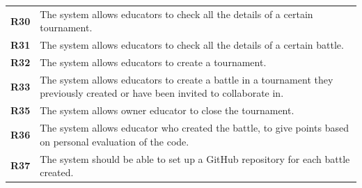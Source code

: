 \documentclass[12pt, a4paper]{report}
\begin{document}
\begin{table}[H]
\begin{tabularx}{\textwidth}{cX}
        \textbf{R30}  & The system allows educators to check all the details of a certain tournament.\\
        \textbf{R31}  & The system allows educators to check all the details of a certain battle.\\
        \textbf{R32}  & The system allows educators to create a tournament.\\
        \textbf{R33}  & The system allows educators to create a battle in a tournament they previously created or have been invited to collaborate in.\\
        \textbf{R35}  & The system allows owner educator to close the tournament. \\
        \textbf{R36}  & The system allows educator who created the battle, to give points based on personal evaluation of the code.\\
        \textbf{R37}  & The system should be able to set up a GitHub repository for each battle created.\\
    \end{tabularx}
    \end{table}
\end{document}
